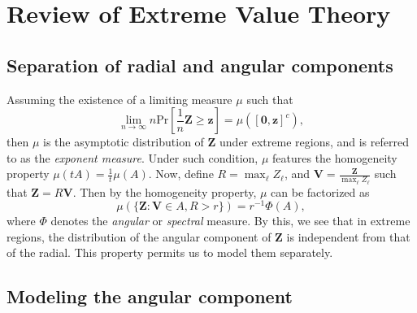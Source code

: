 \section{Review of Extreme Value Theory}


\subsection{Separation of radial and angular components}
Assuming the existence of a limiting measure $\mu$ such that
\[
    \lim_{n\to\infty} n\text{Pr}\left[\frac{1}{n}\bm{Z} \geq \bm{z}\right] = \mu\left([\bm{0},\bm{z}]^c\right),
\]
then $\mu$ is the asymptotic distribution of $\bm{Z}$ under extreme regions, and is referred to as the \emph{exponent measure}.  Under such condition, $\mu$ features the homogeneity property $\mu(tA) = \frac{1}{t}\mu(A)$.  Now, define $R = \max_{\ell} Z_{\ell}$, and $\bm{V} = \frac{\bm{Z}}{\max_{\ell}Z_{\ell}}$ such that $\bm{Z} = R\bm{V}$.  Then by the homogeneity property, $\mu$ can be factorized as
\begin{equation}
    \mu\left(\{\bm{Z} : \bm{V} \in A, R > r\}\right) = r^{-1}\Phi(A),
\end{equation}
where $\Phi$ denotes the \emph{angular} or \emph{spectral} measure.  By this, we see that in extreme regions, the distribution of the angular component of $\bm{Z}$ is independent from that of the radial.  This property permits us to model them separately.

\subsection{Modeling the angular component}









